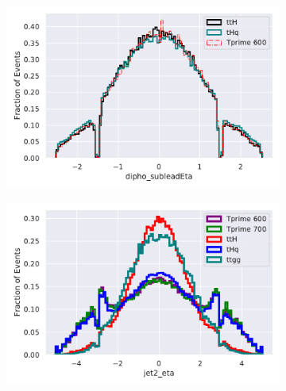 \begin{figure}[H]
\begin{subfigure}{.5\textwidth}
  \centering
  \includegraphics[width=.8\linewidth]{Figure_2/dipho_subleadEta.pdf}  
  \label{fig:sub-fifth}
\end{subfigure}
\begin{subfigure}{.5\textwidth}
  \centering
  \includegraphics[width=.8\linewidth]{Figure_2/jet2_eta.pdf}  
  \label{fig:sub-fourth}
\end{subfigure}


\end{figure}
